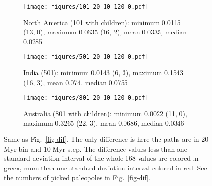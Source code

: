 \begin{figure*}
	\centering
	\begin{subfigure}{1.01\textwidth}
		\texttt{[image: figures/101\_20\_10\_120\_0.pdf]}
		\caption{North America (101 with children): minimum 0.0115 (13, 0), maximum 0.0635 (16, 2), mean 0.0335, median 0.0285}\label{fig-nac-dif2010}
	\end{subfigure}
	\vspace{.1em}
	\begin{subfigure}{1.01\textwidth}
		\texttt{[image: figures/501\_20\_10\_120\_0.pdf]}
		\caption{India (501): minimum 0.0143 (6, 3), maximum 0.1543 (16, 3), mean 0.074, median 0.0755}\label{fig-ind-dif2010}
	\end{subfigure}
	\vspace{.1em}
	\begin{subfigure}{1.01\textwidth}
		\texttt{[image: figures/801\_20\_10\_120\_0.pdf]}
		\caption{Australia (801 with children): minimum 0.0022 (11, 0), maximum 0.3265 (22, 3), mean 0.0686, median 0.0346}\label{fig-au-dif2010}
	\end{subfigure}
	\caption[Differences of each plate's paleomagnetic APWPs versus
its FHM predicted APWP]{Same as Fig.~\ref{fig-dif}. The only difference is here
the paths are in 20 Myr bin and 10 Myr step. The difference values less than
one-standard-deviation interval of the whole 168 values are colored in green,
more than one-standard-deviation interval colored in red. See the numbers
of picked paleopoles in Fig.~\ref{fig-dif}.}\label{fig-dif2010}
\end{figure*}

